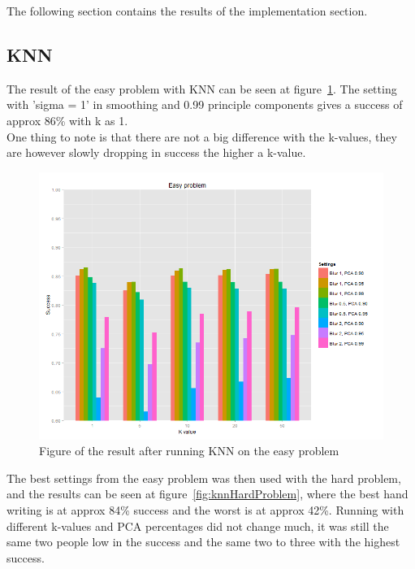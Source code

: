 \documentclass[report]{subfiles}
\begin{document}
\label{sec:result}
The following section contains the results of the implementation section.

\subsection{KNN}
\label{sec:resultKNN}
The result of the easy problem with KNN can be seen at figure~\ref{fig:knnEasyProblem}. The setting with 'sigma = 1' in smoothing and 0.99 principle components gives a success of approx 86\% with k as 1.\\
One thing to note is that there are not a big difference with the k-values, they are however slowly dropping in success the higher a k-value.

\begin{figure}[H]
	\centering
	\includegraphics[width=1\textwidth]{images/knnEasyProblem}
	\caption{Figure of the result after running KNN on the easy problem}
	\label{fig:knnEasyProblem}
\end{figure}

The best settings from the easy problem was then used with the hard problem, and the results can be seen at figure~\ref{fig:knnHardProblem}, where the best hand writing is at approx 84\% success and the worst is at approx 42\%. Running with different k-values and PCA percentages did not change much, it was still the same two people low in the success and the same two to three with the highest success.
\end{document}
